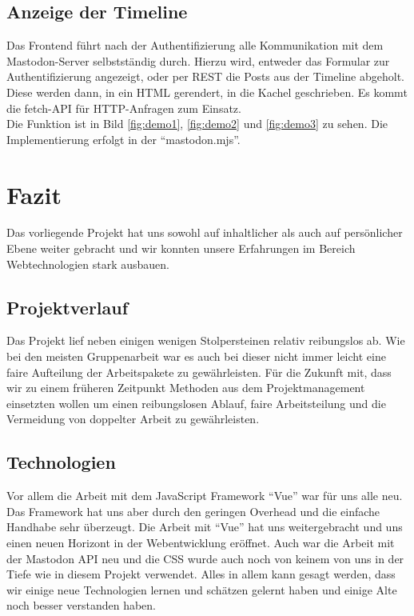\documentclass[fleqn,10pt]{SelfArx} %
\begin{document}
\subsection{Anzeige der Timeline}
Das Frontend führt nach der Authentifizierung alle Kommunikation mit dem Mastodon-Server selbstständig durch. Hierzu wird, entweder das Formular zur Authentifizierung angezeigt, oder per REST die Posts aus der Timeline abgeholt. Diese werden dann, in ein HTML gerendert, in die Kachel geschrieben. Es kommt die fetch-API für HTTP-Anfragen zum Einsatz. \\
Die Funktion ist in Bild \ref{fig:demo1}, \ref{fig:demo2} und \ref{fig:demo3} zu sehen. Die Implementierung erfolgt in der \enquote{mastodon.mjs}.
\section{Fazit}
Das vorliegende Projekt hat uns sowohl auf inhaltlicher als auch auf persönlicher Ebene weiter gebracht und wir konnten unsere Erfahrungen im Bereich Webtechnologien stark ausbauen.
\subsection{Projektverlauf}
Das Projekt lief neben einigen wenigen Stolpersteinen relativ reibungslos ab. Wie bei den meisten Gruppenarbeit war es auch bei dieser nicht immer leicht eine faire Aufteilung der Arbeitspakete zu gewährleisten. Für die Zukunft mit, dass wir zu einem früheren Zeitpunkt Methoden aus dem Projektmanagement einsetzten wollen um einen reibungslosen Ablauf, faire Arbeitsteilung und die Vermeidung von doppelter Arbeit zu gewährleisten.
\subsection{Technologien}
Vor allem die Arbeit mit dem JavaScript Framework \enquote{Vue} war für uns alle neu. Das Framework hat uns aber durch den geringen Overhead und die einfache Handhabe sehr überzeugt. Die Arbeit mit \enquote{Vue} hat uns weitergebracht und uns einen neuen Horizont in der Webentwicklung eröffnet. 
Auch war die Arbeit mit der Mastodon API neu und die CSS wurde auch noch von keinem von uns in der Tiefe wie in diesem Projekt verwendet. Alles in allem kann gesagt werden, dass wir einige neue Technologien lernen und schätzen gelernt haben und einige Alte noch besser verstanden haben.
\end{document}
